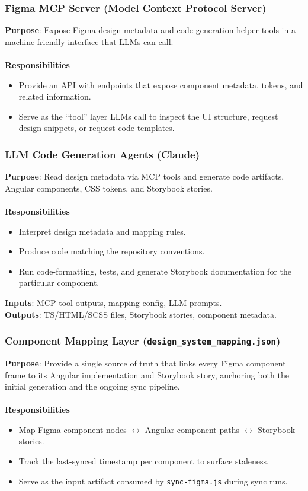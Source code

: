 \subsubsection{Figma MCP Server (Model Context Protocol Server)}

\textbf{Purpose}: Expose Figma design metadata and code-generation helper tools in a machine-friendly interface that LLMs can call.
\\\\
\textbf{Responsibilities}
\begin{itemize}
    \item Provide an API with endpoints that expose component metadata, tokens, and related information.
    \item Serve as the “tool” layer LLMs call to inspect the UI structure, request design snippets, or request code templates.
\end{itemize}

\subsubsection{LLM Code Generation Agents (Claude)}

\textbf{Purpose}: Read design metadata via MCP tools and generate code artifacts, Angular components, CSS tokens, and Storybook stories.
\\\\
\textbf{Responsibilities}
\begin{itemize}
    \item Interpret design metadata and mapping rules.
    \item Produce code matching the repository conventions.
    \item Run code-formatting, tests, and generate Storybook documentation for the particular component.
\end{itemize}

\textbf{Inputs}: MCP tool outputs, mapping config, LLM prompts. 
\\
\textbf{Outputs}: TS/HTML/SCSS files, Storybook stories, component metadata.

\subsubsection{Component Mapping Layer (\texttt{design\_system\_mapping.json})}

\textbf{Purpose}: Provide a single source of truth that links every Figma component frame to its Angular implementation and Storybook story, anchoring both the initial generation and the ongoing sync pipeline.
\\\\
\textbf{Responsibilities}
\begin{itemize}
    \item Map Figma component nodes $\leftrightarrow$ Angular component paths $\leftrightarrow$ Storybook stories.
    \item Track the last-synced timestamp per component to surface staleness.
    \item Serve as the input artifact consumed by \texttt{sync-figma.js} during sync runs.
\end{itemize}

